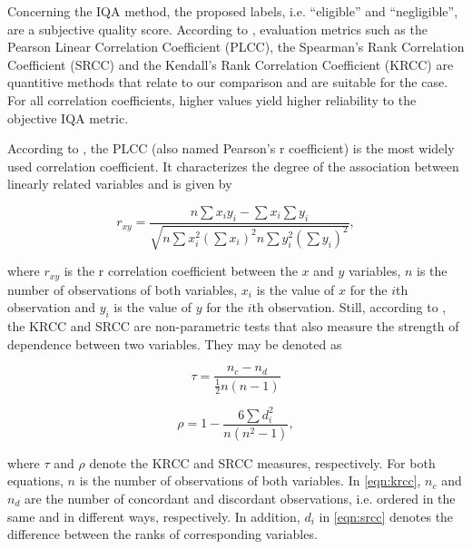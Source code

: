 Concerning the IQA method, the proposed labels, i.e. ``eligible'' and ``negligible'', are a subjective quality score. According to , evaluation metrics such as the Pearson Linear Correlation Coefficient (PLCC), the Spearman's Rank Correlation Coefficient (SRCC) and the Kendall's Rank Correlation Coefficient (KRCC) are quantitive methods that relate to our comparison and are suitable for the case. For all correlation coefficients, higher values yield higher reliability to the objective IQA metric.

According to , the PLCC (also named Pearson's r coefficient) is the most widely used correlation coefficient. It characterizes the degree of the association between linearly related variables and is given by

\begin{equation}
\label{eqn:plcc}
r_{xy} = \frac{n \sum x_{i} y_{i} - \sum x_{i} \sum y_{i}}{\sqrt{n \sum x_{i}^{2} \left(\sum x_{i}\right)^{2} n \sum y_{i}^{2} \left(\sum y_{i}\right)^{2}}},
\end{equation}

\noindent where $r_{xy}$ is the r correlation coefficient between the $x$ and $y$ variables, $n$ is the number of observations of both variables, $x_{i}$ is the value of $x$ for the $i$th observation and $y_{i}$ is the value of $y$ for the $i$th observation. Still, according to , the KRCC and SRCC are non-parametric tests that also measure the strength of dependence between two variables. They may be denoted as

\begin{equation}
\label{eqn:krcc}
\tau = \frac{n_{c} - n_{d}}{\frac{1}{2} n \left(n-1 \right)}
\end{equation}

\begin{equation}
\label{eqn:srcc}
\rho = 1 - \frac{6 \sum d_{i}^{2}}{n \left(n^{2}-1 \right)},
\end{equation}

\noindent where $\tau$ and $\rho$ denote the KRCC and SRCC measures, respectively. For both equations, $n$ is the number of observations of both variables. In \autoref{eqn:krcc}, $n_{c}$ and $n_{d}$ are the number of concordant and discordant observations, i.e. ordered in the same and in different ways, respectively. In addition, $d_{i}$ in \autoref{eqn:srcc} denotes the difference between the ranks of corresponding variables.

